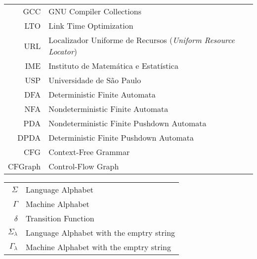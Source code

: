 \begin{tabular}{rl}
	GCC & GNU Compiler Collections \\
	LTO & Link Time Optimization \\
	URL & Localizador Uniforme de Recursos (\emph{Uniform Resource Locator})\\
	IME & Instituto de Matemática e Estatística\\
	USP & Universidade de São Paulo \\
	DFA & Deterministic Finite Automata \\
	NFA & Nondeterministic Finite Automata \\
	PDA & Nondeterministic Finite Pushdown Automata \\
	DPDA & Deterministic Finite Pushdown Automata \\
	CFG & Context-Free Grammar \\
	CFGraph & Control-Flow Graph \\

\end{tabular}


\begin{tabular}{rl}
        $\Sigma$    & Language Alphabet\\
        $\Gamma$    & Machine Alphabet\\
		$\delta$    & Transition Function\\
		$\Sigma_{\lambda}$ & Language Alphabet with the emptry string\\
		$\Gamma_{\lambda}$ & Machine Alphabet with the emptry string\\

\end{tabular}

\clearpage


\disablenewpage{\listoffigures}

\disablenewpage{\listoftables}


